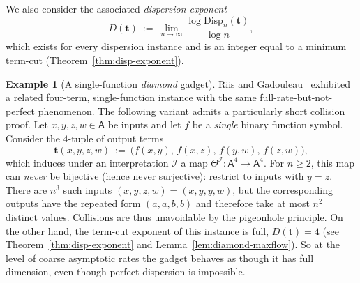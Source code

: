 \documentclass[11pt]{article}
\newcommand{\parencite}[1]{\citep{#1}}
\theoremstyle{definition}
\newtheorem{example}{Example}[section]
\theoremstyle{plain}
\newcommand{\A}{\mathsf{A}}
\newcommand{\Disp}{\mathrm{Disp}}
\begin{document}
We also consider the associated \emph{dispersion exponent}
\[
D(\mathbf t)\ :=\ \lim_{n\to\infty}\frac{\log \Disp_n(\mathbf t)}{\log n},
\]
which exists for every dispersion instance and is an integer equal to a minimum term-cut
(Theorem~\ref{thm:disp-exponent}).

\begin{example}[A single-function \emph{diamond} gadget]
\label{ex:diamond-intro}
Riis and Gadouleau~\parencite{riis2019max} exhibited a related four-term, single-function instance with the
same full-rate-but-not-perfect phenomenon.  The following variant admits a particularly short collision proof.
Let $x,y,z,w\in\A$ be inputs and let $f$ be a \emph{single} binary function symbol.
Consider the $4$-tuple of output terms
\[
\mathbf t(x,y,z,w)\ :=\ \bigl( f(x,y),\, f(x,z),\, f(y,w),\, f(z,w)\bigr),
\]
which induces under an interpretation $\mathcal I$ a map $\Theta^{\mathcal I}:\A^4\to\A^4$.
For $n\ge2$, this map can \emph{never} be bijective (hence never surjective): restrict to inputs with $y=z$.
There are $n^3$ such inputs $(x,y,z,w)=(x,y,y,w)$, but the corresponding outputs have the repeated form
$(a,a,b,b)$ and therefore take at most $n^2$ distinct values.
Collisions are thus unavoidable by the pigeonhole principle.
On the other hand, the term-cut exponent of this instance is full, $D(\mathbf t)=4$
(see Theorem~\ref{thm:disp-exponent} and Lemma~\ref{lem:diamond-maxflow}).
So at the level of coarse asymptotic rates the gadget behaves as though it has full dimension, even though perfect
dispersion is impossible.
\end{example}
\end{document}
